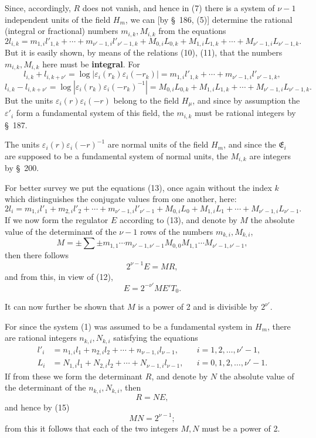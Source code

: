 \documentclass[11pt]{article}
\begin{document}
Since, accordingly, $R$ does not vanish, and hence in (7) there is a system of $\nu-1$ independent units of the field $H_m$, we can [by \S~186, (5)] determine the rational (integral or fractional) numbers $m_{i,k},M_{i,k}$ from the equations
\begin{equation}
2l_{i,k}=m_{1,i}l'_{1,k}+\cdots+m_{\nu'-1,i}l'_{\nu'-1,k}
+M_{0,i}L_{0,k}+M_{1,i}L_{1,k}+\cdots+M_{\nu'-1,i}L_{\nu'-1,k}.
\tag{13}
\end{equation}
But it is easily shown, by means of the relations (10), (11), that the numbers $m_{i,k},M_{i,k}$ here must be \textbf{integral}. For
\[
l_{i,k}+l_{i,k+\nu'}=\log|\varepsilon_i(r_k)\varepsilon_i(-r_k)|
=m_{1,i}l'_{1,k}+\cdots+m_{\nu'-1,i}l'_{\nu'-1,k},
\]
\[
l_{i,k}-l_{i,k+\nu'}=\log|\varepsilon_i(r_k)\varepsilon_i(-r_k)^{-1}|
=M_{0,i}L_{0,k}+M_{1,i}L_{1,k}+\cdots+M_{\nu'-1,i}L_{\nu'-1,k}.
\]
But the units $\varepsilon_i(r)\varepsilon_i(-r)$ belong to the field $H_\mu$, and since by assumption the $\varepsilon'_i$ form a fundamental system of this field, the $m_{i,k}$ must be rational integers by \S~187.

The units $\varepsilon_i(r)\varepsilon_i(-r)^{-1}$ are normal units of the field $H_m$, and since the $\mathfrak E_i$ are supposed to be a fundamental system of normal units, the $M_{i,k}$ are integers by \S~200.

For better survey we put the equations (13), once again without the index $k$ which distinguishes the conjugate values from one another, here:
\begin{equation}
2l_i=m_{1,i}l'_1+m_{2,i}l'_2+\cdots+m_{\nu'-1,i}l'_{\nu'-1}
+M_{0,i}L_0+M_{1,i}L_1+\cdots+M_{\nu'-1,i}L_{\nu'-1}.
\tag{14}
\end{equation}
If we now form the regulator $E$ according to (13), and denote by $M$ the absolute value of the determinant of the $\nu-1$ rows of the numbers $m_{k,i},M_{k,i}$,
\[
M=\pm\sum\pm m_{1,1}\cdots m_{\nu'-1,\nu'-1}M_{0,0}M_{1,1}\cdots M_{\nu'-1,\nu'-1},
\]
then there follows
\begin{equation}
2^{\nu-1}E=MR,
\tag{15}
\end{equation}
and from this, in view of (12),
\begin{equation}
E=2^{-\nu'}ME'T_0.
\tag{16}
\end{equation}

It can now further be shown that $M$ is a power of 2 and is divisible by $2^{\nu'}$.

For since the system (1) was assumed to be a fundamental system in $H_m$, there are rational integers $n_{k,i},N_{k,i}$ satisfying the equations
\begin{equation}
\begin{aligned}
l'_i&=n_{1,i}l_1+n_{2,i}l_2+\cdots+n_{\nu-1,i}l_{\nu-1},&& i=1,2,\ldots,\nu'-1,\\
L_i&=N_{1,i}l_1+N_{2,i}l_2+\cdots+N_{\nu-1,i}l_{\nu-1},&& i=0,1,2,\ldots,\nu'-1.
\end{aligned}
\tag{17}
\end{equation}
If from these we form the determinant $R$, and denote by $N$ the absolute value of the determinant of the $n_{k,i},N_{k,i}$, then
\[
R=NE,
\]
and hence by (15)
\[
MN=2^{\nu-1};
\]
from this it follows that each of the two integers $M,N$ must be a power of 2.
\end{document}
